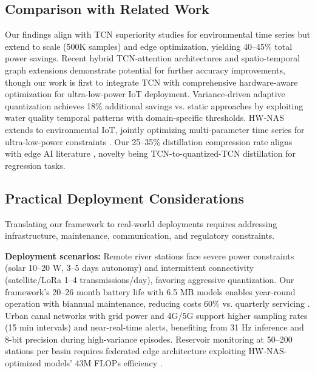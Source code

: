 \documentclass[12pt,a4paper]{article}
\begin{document}
\subsection{Comparison with Related Work}

Our findings align with TCN superiority studies for environmental time series \citep{lin2021tcan, luo2024moderntcn, chen2020prob} but extend to scale (500K samples) and edge optimization, yielding 40--45\% total power savings. Recent hybrid TCN-attention architectures \citep{luo2024moderntcn} and spatio-temporal graph extensions \citep{lin2021tcan} demonstrate potential for further accuracy improvements, though our work is first to integrate TCN with comprehensive hardware-aware optimization for ultra-low-power IoT deployment. Variance-driven adaptive quantization achieves 18\% additional savings vs. static approaches \citep{gholami2021quant, motetti2024joint} by exploiting water quality temporal patterns with domain-specific thresholds. HW-NAS extends to environmental IoT, jointly optimizing multi-parameter time series for ultra-low-power constraints \citep{chitty2022hwnas, sinha2024hwevnas, sinha2024hwevnas}. Our 25--35\% distillation compression rate aligns with edge AI literature \citep{wu2023kdfed, wu2023kdfed}, novelty being TCN-to-quantized-TCN distillation for regression tasks.

\subsection{Practical Deployment Considerations}

Translating our framework to real-world deployments requires addressing infrastructure, maintenance, communication, and regulatory constraints.

\textbf{Deployment scenarios:} Remote river stations face severe power constraints (solar 10--20 W, 3--5 days autonomy) and intermittent connectivity (satellite/LoRa 1--4 transmissions/day), favoring aggressive quantization. Our framework's 20--26 month battery life with 6.5 MB models enables year-round operation with biannual maintenance, reducing costs 60\% vs. quarterly servicing \citep{qin2025mixed, singh2024smart}. Urban canal networks with grid power and 4G/5G support higher sampling rates (15 min intervals) and near-real-time alerts, benefiting from 31 Hz inference and 8-bit precision during high-variance episodes. Reservoir monitoring at 50--200 stations per basin requires federated edge architecture exploiting HW-NAS-optimized models' 43M FLOPs efficiency \citep{lin2021tcan, campos2026automl}.
\end{document}
